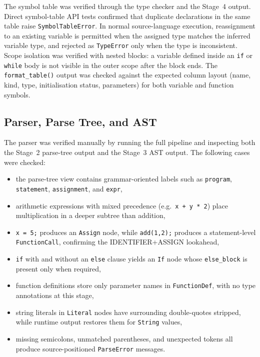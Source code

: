 The symbol table was verified through the type checker and the Stage~4 output.
Direct symbol-table API tests confirmed that duplicate declarations in the
same table raise \texttt{SymbolTableError}. In normal source-language
execution, reassignment to an existing variable is permitted when the assigned
type matches the inferred variable type, and rejected as \texttt{TypeError}
only when the type is inconsistent. Scope isolation was verified with
nested blocks: a variable defined inside an \texttt{if} or \texttt{while} body
is not visible in the outer scope after the block ends. The
\texttt{format\_table()} output was checked against the expected column layout
(name, kind, type, initialisation status, parameters) for both variable and
function symbols.

\subsection{Parser, Parse Tree, and AST}
The parser was verified manually by running the full pipeline and inspecting
both the Stage~2 parse-tree output and the Stage~3 AST output. The following
cases were checked:

\begin{itemize}
    \item the parse-tree view contains grammar-oriented labels such as \texttt{program}, \texttt{statement}, \texttt{assignment}, and \texttt{expr},
    \item arithmetic expressions with mixed precedence (e.g.\ \texttt{x + y * 2}) place multiplication in a deeper subtree than addition,
    \item \texttt{x = 5;} produces an \texttt{Assign} node, while \texttt{add(1,2);} produces a statement-level \texttt{FunctionCall}, confirming the IDENTIFIER+ASSIGN lookahead,
    \item \texttt{if} with and without an \texttt{else} clause yields an \texttt{If} node whose \texttt{else\_block} is present only when required,
    \item function definitions store only parameter names in \texttt{FunctionDef}, with no type annotations at this stage,
    \item string literals in \texttt{Literal} nodes have surrounding double-quotes stripped, while runtime output restores them for \texttt{String} values,
    \item missing semicolons, unmatched parentheses, and unexpected tokens all produce source-positioned \texttt{ParseError} messages.
\end{itemize}

